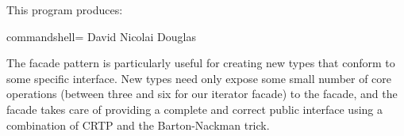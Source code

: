 This program produces:

\begin{tcblisting}{commandshell={}}
David
Nicolai
Douglas
\end{tcblisting}

The facade pattern is particularly useful for creating new types that conform to some specific interface. New types need only expose some small number of core operations (between three and six for our iterator facade) to the facade, and the facade takes care of providing a complete and correct public interface using a combination of CRTP and the Barton-Nackman trick.












